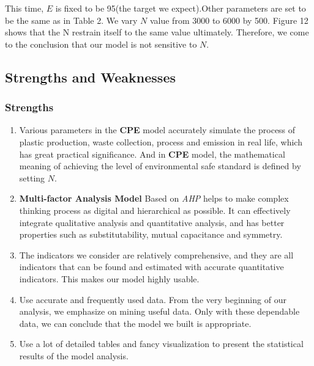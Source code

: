 \documentclass{mcmthesis}
\begin{document}
This time, $E$ is fixed to be 95(the target we expect).Other parameters are set to be the same as in Table 2.
We vary $N$ value from 3000 to 6000 by 500. Figure 12 shows that the N restrain itself to the same value ultimately. Therefore, we come to the conclusion
that our model is not sensitive to $N$. 



 \subsection{Strengths and Weaknesses}
 \subsubsection{Strengths}
	\begin{enumerate}
	 \item Various parameters in the \textbf{CPE} model accurately simulate the process of plastic production, waste collection, process and emission in real life, which has great practical significance. And in \textbf{CPE} model, the mathematical meaning of achieving the level of environmental safe standard is defined by setting $N$.
	 \item \textbf{Multi-factor Analysis Model} Based on \textit{AHP} helps to make complex thinking process as digital and hierarchical as possible. It can effectively integrate qualitative analysis and quantitative analysis, and has better properties such as substitutability, mutual capacitance and symmetry.
     \item The indicators we consider are relatively comprehensive, and they are all indicators that can be found and estimated with accurate quantitative indicators. This makes our model highly usable. \\
     \item Use accurate and frequently used data. From the very beginning of our analysis, we emphasize on mining useful data.  Only with these dependable data, we can conclude that the model we built is appropriate.\\
     \item Use a lot of detailed tables and fancy visualization to present the statistical results of the model analysis.\\
	
	\end{enumerate}
 
\end{document}

